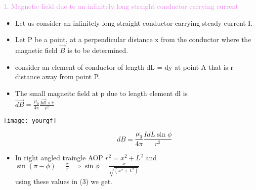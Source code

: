 \documentclass{beamer}
\begin{document}
\begin{frame}
\textcolor{violet}{1. Magnetic field due to an infinitely long straight conductor carrying current}


\begin{minipage}{0.7\textwidth}
\begin{itemize}
\item Let us consider an infinitely long straight conductor
carrying steady current I.
\item Let P be a point, at a perpendicular distance x from the conductor where the magnetic field $\vec{B}$ is to be determined.
\item consider an element of conductor of length dL = dy at point A that is 
 r distance away from point P.
 \item The small magneitc field  at p due to length element dl is\\
 \hspace{3 cm} $\vec{dB}=\frac{\mu_0}{4\pi}\frac{I\vec{dl}\times\hat{r}}{r^2}$
 
\end{itemize}
\end{minipage}%
\begin{minipage}{0.3\textwidth}
    \texttt{[image: yourgf]} %
\end{minipage}
\begin{equation}
\hspace{2cm}  dB=\frac{\mu_0}{4\pi}\frac{IdL\sin\phi}{r^2}
\end{equation}

\begin{itemize}
\item In right angled traingle AOP $r^2=x^2+L^2$ and $\sin(\pi-\phi)=\frac{x}{r} \implies \sin\phi=\frac{x}{\sqrt{(x^2+L^2)}}$\\
using these values  in (3) we get.
\end{itemize}
 \end{frame}
\end{document}
